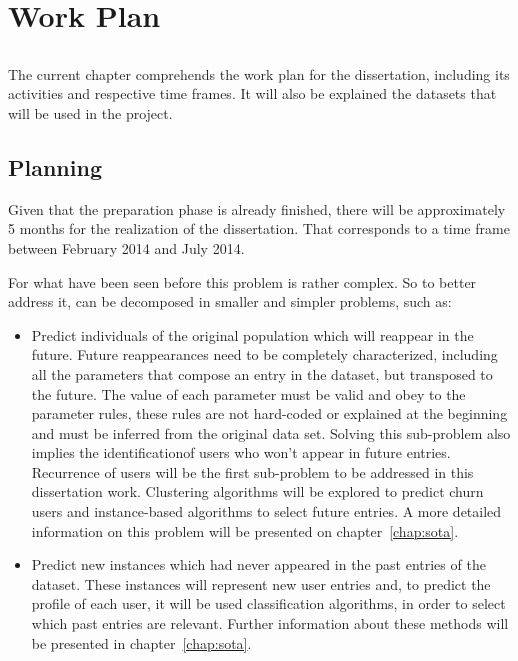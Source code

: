 \chapter{Work Plan}\label{chap:chap3}

\section*{}

The current chapter comprehends the work plan for the dissertation, including its activities and respective time frames.
It will also be explained the datasets that will be used in the project.

\section{Planning}

Given that the preparation phase is already finished, there will be approximately 5 months for the realization of the dissertation.
That corresponds to a time frame between February 2014 and July 2014.

For what have been seen before this problem is rather complex. So to better
address it, can be decomposed in smaller and simpler problems, such as:
\begin{itemize}
    \item Predict individuals of the original population which will reappear in the future. Future reappearances need to be completely characterized, including 
      all the parameters that compose an entry in the dataset, but transposed to the future. The value of each parameter must be valid and obey to the parameter
      rules, these rules are not hard-coded or explained at the beginning and must be inferred from the original data set. Solving this sub-problem also implies the identificationof users who won't appear in future entries. Recurrence of users will be the first sub-problem to be addressed in this dissertation work. 
      Clustering algorithms will be explored to predict churn users and instance-based algorithms to select future entries. A more detailed information
      on this problem will be presented on chapter~\ref{chap:sota}.
    \item Predict new instances which had never appeared in the past entries of the dataset.
      These instances will represent new user entries and, to predict the profile of each user, it will be used classification algorithms, in order to select 
      which past entries are relevant. Further information about these methods will be presented in
      chapter~\ref{chap:sota}.
\end{itemize}

